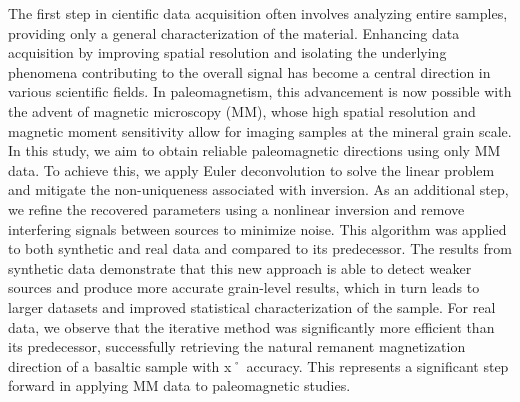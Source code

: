 The first step in cientific data acquisition often involves analyzing entire samples, providing only a general characterization of the material. Enhancing data acquisition by improving spatial resolution and isolating the underlying phenomena contributing to the overall signal has become a central direction in various scientific fields. In paleomagnetism, this advancement is now possible with the advent of magnetic microscopy (MM), whose high spatial resolution and magnetic moment sensitivity allow for imaging samples at the mineral grain scale. In this study, we aim to obtain reliable paleomagnetic directions using only MM data. To achieve this, we apply Euler deconvolution to solve the linear problem and mitigate the non-uniqueness associated with inversion. As an additional step, we refine the recovered parameters using a nonlinear inversion and remove interfering signals between sources to minimize noise. This algorithm was applied to both synthetic and real data and compared to its predecessor. The results from synthetic data demonstrate that this new approach is able to detect weaker sources and produce more accurate grain-level results, which in turn leads to larger datasets and improved statistical characterization of the sample. For real data, we observe that the iterative method was significantly more efficient than its predecessor, successfully retrieving the natural remanent magnetization direction of a basaltic sample with x˚ accuracy. This represents a significant step forward in applying MM data to paleomagnetic studies.